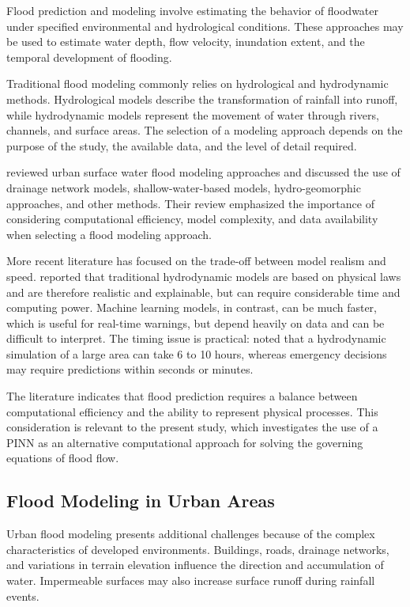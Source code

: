Flood prediction and modeling involve estimating the behavior of floodwater under specified environmental and hydrological conditions. These approaches may be used to estimate water depth, flow velocity, inundation extent, and the temporal development of flooding.

Traditional flood modeling commonly relies on hydrological and hydrodynamic methods. Hydrological models describe the transformation of rainfall into runoff, while hydrodynamic models represent the movement of water through rivers, channels, and surface areas. The selection of a modeling approach depends on the purpose of the study, the available data, and the level of detail required.

 reviewed urban surface water flood modeling approaches and discussed the use of drainage network models, shallow-water-based models, hydro-geomorphic approaches, and other methods. Their review emphasized the importance of considering computational efficiency, model complexity, and data availability when selecting a flood modeling approach.

More recent literature has focused on the trade-off between model realism and speed.  reported that traditional hydrodynamic models are based on physical laws and are therefore realistic and explainable, but can require considerable time and computing power. Machine learning models, in contrast, can be much faster, which is useful for real-time warnings, but depend heavily on data and can be difficult to interpret. The timing issue is practical:  noted that a hydrodynamic simulation of a large area can take 6 to 10 hours, whereas emergency decisions may require predictions within seconds or minutes.

The literature indicates that flood prediction requires a balance between computational efficiency and the ability to represent physical processes. This consideration is relevant to the present study, which investigates the use of a PINN as an alternative computational approach for solving the governing equations of flood flow.

\subsection{Flood Modeling in Urban Areas}

Urban flood modeling presents additional challenges because of the complex characteristics of developed environments. Buildings, roads, drainage networks, and variations in terrain elevation influence the direction and accumulation of water. Impermeable surfaces may also increase surface runoff during rainfall events.

